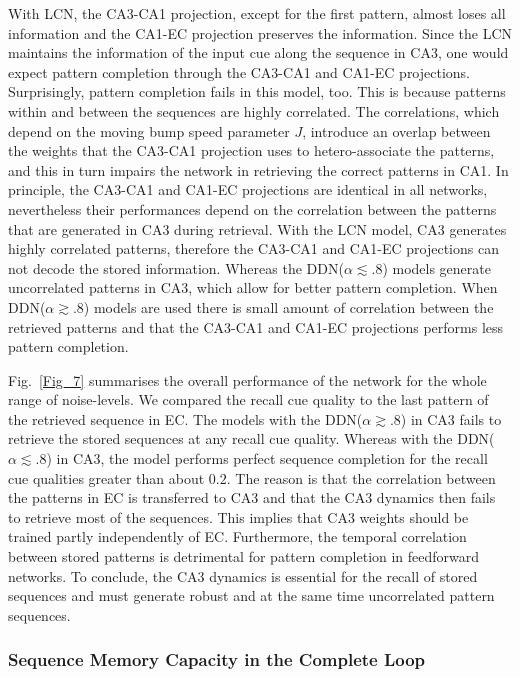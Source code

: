 \documentclass[utf8]{frontiersSCNS} %
\begin{document}
With LCN, the CA3-CA1 projection, except for the first pattern, almost loses all information and the CA1-EC projection preserves the information.
Since the LCN maintains the information of the input cue along the sequence in CA3, one would expect pattern completion through the CA3-CA1 and CA1-EC projections. Surprisingly, pattern completion fails in this model, too. This is because patterns within and between the sequences are highly correlated. The correlations, which depend on the moving bump speed parameter $J$, introduce an overlap between the weights that the CA3-CA1 projection uses to hetero-associate the patterns, and this in turn impairs the network in retrieving the correct patterns in CA1.
%
In principle, the CA3-CA1 and CA1-EC projections are identical in all networks, nevertheless their performances depend on the correlation between the patterns that are generated in CA3 during retrieval. With the LCN model, CA3 generates highly correlated patterns, therefore the CA3-CA1 and CA1-EC projections can not decode the stored information. Whereas the DDN($\alpha \lesssim .8$) models generate uncorrelated patterns in CA3, which allow for better pattern completion. When DDN($\alpha \gtrsim .8$) models are used there is small amount of correlation between the retrieved patterns and that the CA3-CA1 and CA1-EC projections performs less pattern completion.

%
Fig.~\ref{Fig_7} summarises the overall performance of the network for the whole range of noise-levels. We compared the recall cue quality to the last pattern of the retrieved sequence in EC. The models with the DDN($\alpha \gtrsim .8$) in CA3 fails to retrieve the stored sequences at any recall cue quality. Whereas with the DDN($\alpha \lesssim .8$) in CA3, the model performs perfect sequence completion for the recall cue qualities greater than about $0.2$.
%
The reason is that the correlation between the patterns in EC is transferred to CA3 and that the CA3 dynamics then fails to retrieve most of the sequences. This implies that CA3 weights should be trained partly independently of EC. Furthermore, the temporal correlation between stored patterns is detrimental for pattern completion in feedforward networks. 
To conclude, the CA3 dynamics is essential for the recall of stored sequences and must generate robust and at the same time uncorrelated pattern sequences.          

\subsubsection{Sequence Memory Capacity in the Complete Loop}
\end{document}
